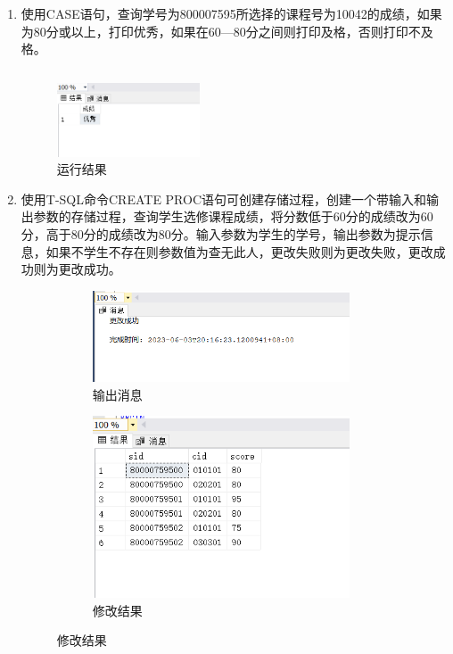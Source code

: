 \documentclass[a4paper,twoside]{article}
\begin{document}
\begin{spacing}{1.2}
\begin{enumerate}
\begin{figure}[h]
\end{figure}
  \item 使用CASE语句，查询学号为800007595所选择的课程号为10042的成绩，如果为80分或以上，打印优秀，如果在60—80分之间则打印及格，否则打印不及格。
\inputminted[firstline=108,lastline=114]{sql}{../code/1.sql}
\begin{figure}[h]
  \centering
  \caption{运行结果}
  \includegraphics[width=0.4\textwidth]{images/5.png}
\end{figure}
  \item 使用T-SQL命令CREATE PROC语句可创建存储过程，创建一个带输入和输出参数的存储过程，查询学生选修课程成绩，将分数低于60分的成绩改为60分，高于80分的成绩改为80分。输入参数为学生的学号，输出参数为提示信息，如果不学生不存在则参数值为查无此人，更改失败则为更改失败，更改成功则为更改成功。
\begin{figure}[h]
  \centering
  \caption{运行结果}
  \begin{subfigure}{0.4\textwidth}
    \caption{输出消息}
    \includegraphics[width=0.9\textwidth]{images/6.png}
  \end{subfigure}
  \begin{subfigure}{0.4\textwidth}
    \caption{修改结果}
    \includegraphics[width=0.9\textwidth]{images/7.png}
  \end{subfigure}
\end{figure}
\inputminted[firstline=118,lastline=174]{sql}{../code/1.sql}


\end{enumerate}
\end{spacing}
\end{document}
